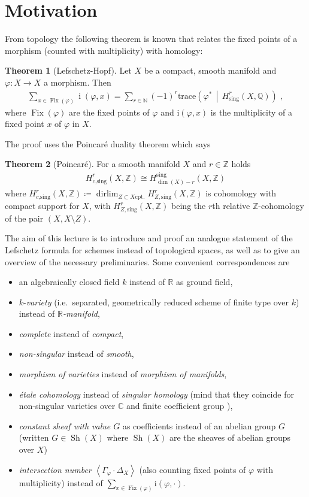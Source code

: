 \documentclass[english,headsepline=0.25pt]{scrartcl}
\theoremstyle{definition}
\newtheorem*{Thm*}{Theorem}
\theoremstyle{remark}
\newcommand*{\N}{\mathds{N}}
\newcommand*{\Z}{\mathds{Z}}
\newcommand*{\Q}{\mathds{Q}}
\newcommand*{\R}{\mathds{R}}
\newcommand*{\C}{\mathds{C}}
\DeclareMathOperator*{\dirlim}{dirlim} %
\DeclareMathOperator{\Sh}{Sh} %
\newcommand*{\idest}{i.e.\ }
\newcommand*{\intProd}[2]{{#1\cdot#2}} %
\newcommand*{\intNum}[1]{{\left\langle{#1}\right\rangle}} %
\newcommand*{\Graph}[1]{{\Gamma_{#1}}} %
\newcommand*{\Diag}[1]{{\Delta_{#1}}} %
\newcommand*{\trace}[2]{{\text{trace}\left(#1 \,\middle|\, #2 \right)}} %
\renewcommand*{\phi}{\varphi}
\begin{document}
\section{Motivation}
From topology the following theorem is known that relates the fixed
points of a morphism (counted with multiplicity) with homology:
\begin{Thm*}[Lefschetz-Hopf]
  Let $X$ be a compact, smooth manifold and
  $\phi\colon X\to X$ a morphism. Then
  \begin{gather*}
    \sum_{x\in\operatorname{Fix}(\phi)} \operatorname{i}(\phi,x)
    =\sum_{r\in\N}(-1)^r \trace{\phi^*}{H_\text{sing}^r(X,\Q)}\;,
  \end{gather*}
  where $\operatorname{Fix}(\phi)$ are the fixed points of $\phi$ and
  $\mathrm i(\phi,x)$ is the multiplicity of a fixed point $x$ of $\phi$
  in $X$.
\end{Thm*}
The proof uses the Poincaré duality theorem which says
\begin{Thm*}[Poincaré]
  For a smooth manifold $X$ and $r\in\Z$ holds
  \begin{gather*}
    H_{c\text{,sing}}^r(X,\Z) \cong H_{\dim(X)-r}^{\text{sing}}(X,\Z)
  \end{gather*}
  where $H_{c\text{,sing}}^r(X,\Z)\coloneqq
  \dirlim_{Z\subset X \text{cpt.}}H_{Z,\text{sing}}^r(X,\Z)$
  is cohomology with compact support for $X$,
  with $H_{Z,\text{sing}}^r(X,\Z)$ being the $r$th relative
  $\Z$-cohomology of the pair $(X,X\setminus Z)$.
\end{Thm*}
The aim of this lecture is to introduce and proof an analogue
statement of the Lefschetz formula for schemes instead of topological
spaces, as well as to give an overview of the necessary preliminaries.
Some convenient correspondences are
\begin{itemize}
\item an algebraically closed field $k$ instead of $\R$ as ground field,
\item $k$-\emph{variety}
  (\idest separated, geometrically reduced scheme of finite type over $k$)
  instead of \emph{$\R$-manifold},
\item \emph{complete} instead of \emph{compact},
\item \emph{non-singular} instead of \emph{smooth},
\item \emph{morphism of varieties} instead of \emph{morphism of manifolds},
\item \emph{étale cohomology} instead of \emph{singular homology}
  (mind that they coincide for non-singular varieties over $\C$ and
  finite coefficient group \cite[see][Thm.~I.21.1]{milne}),
\item \emph{constant sheaf with value $G$}
  as coefficients instead of an abelian group $G$
  (written $G\in\Sh(X)$ where
  $\Sh(X)$ are the sheaves of abelian groups over $X$)
\item \emph{intersection number} $\intNum{\intProd{\Graph{\phi}}{\Diag{X}}}$
  (also counting fixed points of $\phi$ with multiplicity)
  instead of $\sum_{x\in\operatorname{Fix}(\phi)}\mathrm{i}(\phi,\cdot)$.
\end{itemize}
\end{document}
